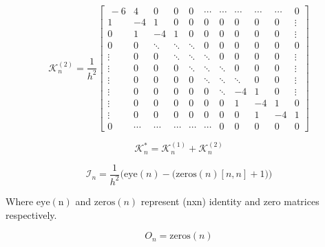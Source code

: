 \[
    \mathcal{K}_n^{(2)}  = 
\frac{1}{h^2}
\begin{bmatrix} \,
-6 & 4 & 0 & 0& 0 & \cdots & \cdots & \cdots & \cdots & \cdots & 0 \\
1 & -4 & 1 & 0 & 0 & 0 & 0 & 0 & 0 & 0 & \vdots \\
0 & 1 & -4 & 1 & 0 & 0 & 0 & 0 & 0 & 0 & \vdots \\
0 & 0 & \ddots & \ddots & \ddots & 0 & 0 & 0 & 0 & 0 & 0 \\
\vdots & 0  & 0  & \ddots & \ddots & \ddots & 0 & 0 & 0 & 0  & \vdots \\
\vdots & 0  & 0  & 0  & \ddots & \ddots & \ddots & 0 & 0 & 0 & \vdots \\
\vdots & 0  & 0  & 0 & 0 & \ddots & \ddots & \ddots & 0 & 0  & \vdots \\
\vdots & 0  & 0  & 0 & 0 & 0 & \ddots & -4 & 1 & 0  & \vdots\\
\vdots & 0  & 0  & 0 & 0 & 0 & 0 & 1 & -4  & 1 & 0\\
\vdots & 0 & 0 & 0 & 0 & 0 & 0 & 0 & 1 & -4 & 1\\
0      & \cdots & \cdots & \cdots & \cdots & \cdots & 0 & 0 & 0 & 0 & 0 
\end{bmatrix}
\]

\[
	\mathcal{K}_n^{*} = \mathcal{K}_n^{(1)} + \mathcal{K}_n^{(2)} 
\]

\[
    \mathcal{I}_n = \frac{1}{h^2} \bigg( \mathrm{eye}(n) - \big( \mathrm{zeros}(n)[n,n] + 1 \big) \bigg)
\]

Where $\mathrm{eye}(\mathrm{n})$ and $\mathrm{zeros}({n})$ represent (nxn) identity and zero matrices respectively.

\[ 
	O_{n} = \mathrm{zeros}(n)
\]	
\fi

